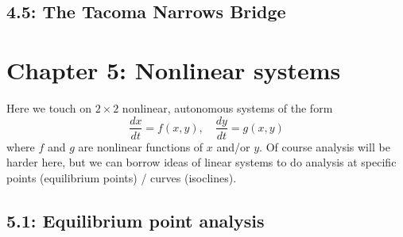 \documentclass{article}
\begin{document}
\subsection{4.5: The Tacoma Narrows Bridge}



\section{Chapter 5: Nonlinear systems}

Here we touch on $2 \times 2$ nonlinear, autonomous systems of the form
\[
\frac{dx}{dt} = f(x,y), \quad \frac{dy}{dt} = g(x,y) 
\]
where $f$ and $g$ are nonlinear functions of $x$ and/or $y$. Of course analysis will be harder here, but we can borrow ideas of linear systems to do analysis at specific points (equilibrium points) / curves (isoclines).

\subsection{5.1: Equilibrium point analysis}
\end{document}
